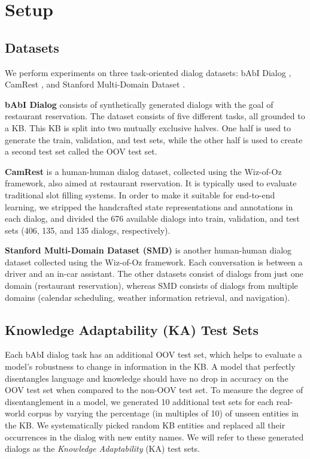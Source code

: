 \section{Setup}
\subsection{Datasets}

We perform experiments on three task-oriented dialog datasets: bAbI Dialog \cite{BordesW16}, CamRest \cite{wenEMNLP2016}, and Stanford Multi-Domain Dataset \cite{Ericsigdial}.

\noindent 
\textbf{bAbI Dialog} consists of synthetically generated dialogs with the goal of restaurant reservation. The dataset consists of five different tasks, all grounded to a KB. This KB is split into two mutually exclusive halves. One half is used to generate the train, validation, and test sets, while the other half is used to create a second test set called the OOV test set. 

\noindent 
\textbf{CamRest} is a human-human dialog dataset, collected using the Wiz-of-Oz framework, also aimed at restaurant reservation. It is typically used to evaluate traditional slot filling systems. In order to make it suitable for end-to-end learning, we stripped the handcrafted state representations and annotations in each dialog, and divided the 676 available dialogs into train, validation, and test sets (406, 135, and 135 dialogs, respectively).

\noindent
\textbf{Stanford Multi-Domain Dataset (SMD)} is another human-human dialog dataset collected using the Wiz-of-Oz framework. Each conversation is between a driver and an in-car assistant. The other datasets consist of dialogs from just one domain (restaurant reservation), whereas SMD consists of dialogs from multiple domains (calendar scheduling, weather information retrieval, and navigation).

\subsection{Knowledge Adaptability (KA) Test Sets}

Each bAbI dialog task has an additional OOV test set, which helps to evaluate a model's robustness to change in information in the KB. A model that perfectly disentangles language and knowledge should have no drop in accuracy on the OOV test set when compared to the non-OOV test set. To measure the degree of disentanglement in a model, we generated 10 additional test sets for each real-world corpus by varying the percentage (in multiples of 10) of unseen entities in the KB. We systematically picked random KB entities and replaced all their occurrences in the dialog with new entity names. We will refer to these generated dialogs as the \emph{Knowledge Adaptability} (KA) test sets.

